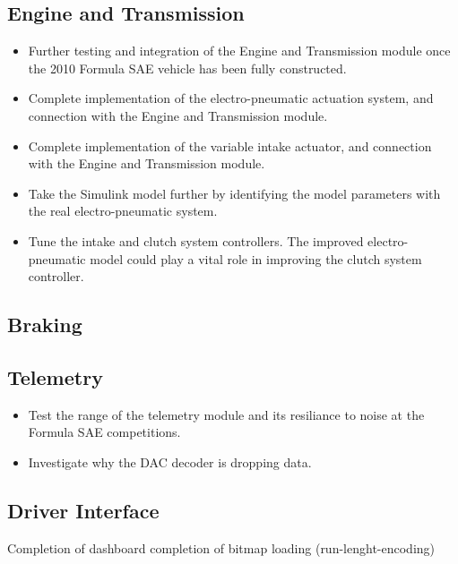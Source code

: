 \subsection{Engine and Transmission}

\begin{itemize}
  \item Further testing and integration of the Engine and Transmission module once the 2010 Formula SAE vehicle has been fully constructed.
  \item Complete implementation of the electro-pneumatic actuation system, and connection with the Engine and Transmission module.
  \item Complete implementation of the variable intake actuator, and connection with the Engine and Transmission module.
  \item Take the Simulink model further by identifying the model parameters with the real electro-pneumatic system.
  \item Tune the intake and clutch system controllers. The improved electro-pneumatic model could play a vital role in improving the clutch system controller.
\end{itemize}

\subsection{Braking}

\subsection{Telemetry}

\begin{itemize}
  \item Test the range of the telemetry module and its resiliance to noise at the Formula SAE competitions.
  \item Investigate why the DAC decoder is dropping data.
\end{itemize}

\subsection{Driver Interface}

Completion of dashboard
completion of bitmap loading (run-lenght-encoding)
